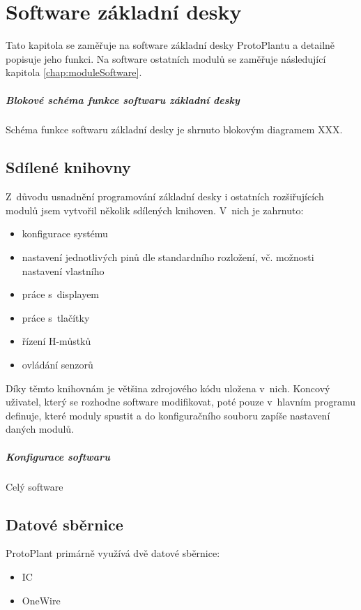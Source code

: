 \chapter{Software základní desky}
Tato kapitola se zaměřuje na software základní desky ProtoPlantu a detailně popisuje jeho funkci.
Na software ostatních modulů se zaměřuje následující kapitola \ref{chap:moduleSoftware}.

\paragraph{Blokové schéma funkce softwaru základní desky}
Schéma funkce softwaru základní desky je shrnuto blokovým diagramem XXX.

\section{Sdílené knihovny}
Z~důvodu usnadnění programování základní desky i ostatních rozšiřujících modulů jsem vytvořil několik sdílených knihoven. 
V~nich je zahrnuto:
\begin{itemize}
    \item konfigurace systému
    \item nastavení jednotlivých pinů dle standardního rozložení, vč. možnosti nastavení vlastního
    \item práce s~displayem
    \item práce s~tlačítky
    \item řízení H-můstků
    \item ovládání senzorů
\end{itemize}
Díky těmto knihovnám je většina zdrojového kódu uložena v~nich. 
Koncový uživatel, který se rozhodne software modifikovat, poté pouze v~hlavním programu definuje, které moduly spustit a do konfiguračního souboru zapíše nastavení daných modulů.

\paragraph{Konfigurace softwaru}
Celý software 

\section{Datové sběrnice}
ProtoPlant primárně využívá dvě datové sběrnice:
\begin{itemize}
    \item IC
    \item OneWire
\end{itemize}

